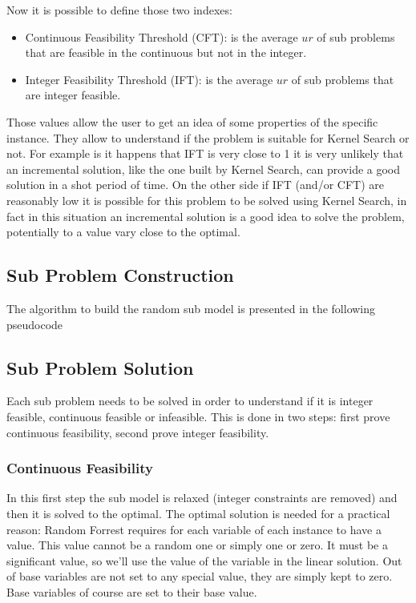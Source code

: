 Now it is possible to define those two indexes:
\begin{itemize}
    \item Continuous Feasibility Threshold (CFT): is the average $ur$ of sub problems that are feasible in the continuous but not in the integer.
    \item Integer Feasibility Threshold (IFT): is the average $ur$ of sub problems that are integer feasible.
\end{itemize}


Those values allow the user to get an idea of some properties of the specific instance. They allow to understand if the problem is suitable for Kernel Search or not. 
For example is it happens that IFT is very close to 1 it is very unlikely that an incremental solution, like the one built by Kernel Search, can provide a good solution in
a shot period of time. On the other side if IFT (and/or CFT) are reasonably low it is possible for this problem to be solved using Kernel Search, in fact in this situation
an incremental solution is a good idea to solve the problem, potentially to a value vary close to the optimal. 


\subsection{Sub Problem Construction}

The algorithm to build the random sub model is presented in the following pseudocode




\subsection{Sub Problem Solution}
Each sub problem needs to be solved in order to understand if it is integer feasible, continuous feasible or infeasible. 
This is done in two steps: first prove continuous feasibility, second prove integer feasibility. 

\subsubsection{Continuous Feasibility}
In this first step the sub model is relaxed (integer constraints are removed) and then it is solved to the optimal. The optimal solution is needed for a 
practical reason: Random Forrest requires for each variable of each instance to have a value. This value cannot be a random one or simply one or zero. It
must be a significant value, so we'll use the value of the variable in the linear solution. Out of base variables are not set to any special value, they are 
simply kept to zero. Base variables of course are set to their base value. 

